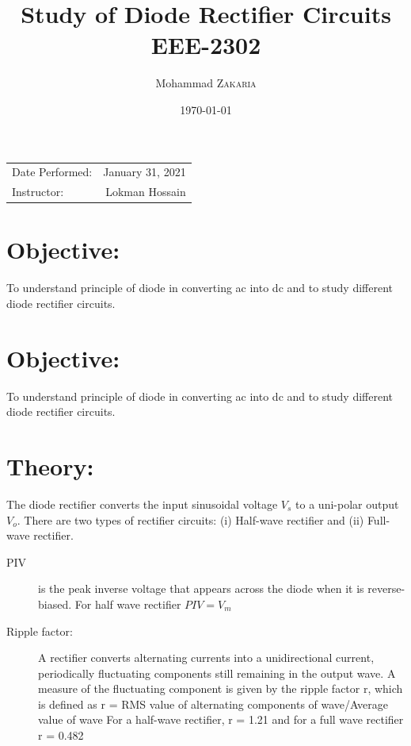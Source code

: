 \documentclass{article}
\title{Study of Diode Rectifier Circuits \\ EEE-2302} %
\author{Mohammad \textsc{Zakaria}} %
\date{\today} %
\begin{document}
	
	\maketitle %
	
	\begin{center}
		\begin{tabular}{l r}
			Date Performed: & January 31, 2021 \\ %
			Instructor: & Lokman Hossain %
		\end{tabular}
	\end{center}
	
	
	\section{Objective:}
	
	To understand principle of diode in converting ac into dc and to study different diode rectifier circuits.
	
	
	\section{Objective:}
	To understand principle of diode in converting ac into dc and to study different diode rectifier circuits.
	
	
	\section{Theory:}
	The diode rectifier converts the input sinusoidal voltage $V_s$ to a uni-polar output $V_o$. There are
	two types of rectifier circuits: (i) Half-wave rectifier and (ii) Full-wave rectifier.
	
	\begin{description}
		\item[PIV]  is the peak inverse voltage that appears across the diode when it is reverse-biased. For half wave
		rectifier $PIV = V_m$
	\end{description}
	
		\begin{description}
			\item[Ripple factor:]  A rectifier converts alternating currents into a unidirectional current, periodically fluctuating components
			still remaining in the output wave. A measure of the fluctuating component is given by the ripple factor r,
			which is defined as
			r = RMS value of alternating components of wave/Average value of wave
			For a half-wave rectifier, r = 1.21 and for a full wave rectifier r = 0.482
		\end{description}
\end{document}
